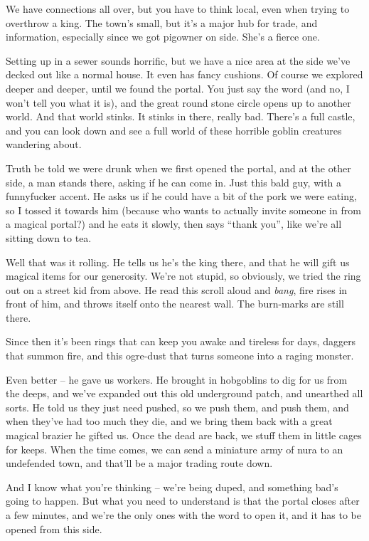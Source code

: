 \begin{speechtext}

	We have connections all over, but you have to think local, even when trying to overthrow a king.  The town's small, but it's a major hub for trade, and information, especially since we got \gls{pigowner} on side.  She's a fierce one.

	Setting up in a sewer sounds horrific, but we have a nice area at the side we've decked out like a normal house.
	It even has fancy cushions.
	Of course we explored deeper and deeper, until we found the portal.
	You just say the word (and no, I won't tell you what it is), and the great round stone circle opens up to another world.
	And that world stinks.
	It stinks in there, really bad.
	There's a full castle, and you can look down and see a full world of these horrible goblin creatures wandering about.

	Truth be told we were drunk when we first opened the portal, and at the other side, a man stands there, asking if he can come in.
	Just this bald guy, with a funnyfucker accent.
	He asks us if he could have a bit of the pork we were eating, so I tossed it towards him (because who wants to actually invite someone in from a magical portal?) and he eats it slowly, then says ``thank you'', like we're all sitting down to tea.

	Well that was it rolling.  He tells us he's the king there, and that he will gift us magical items for our generosity.  We're not stupid, so obviously, we tried the ring out on a street kid from above.  He read this scroll aloud and \emph{bang}, fire rises in front of him, and throws itself onto the nearest wall.  The burn-marks are still there.

	Since then it's been rings that can keep you awake and tireless for days, daggers that summon fire, and this ogre-dust that turns someone into a raging monster.

	Even better -- he gave us workers.
	He brought in hobgoblins to dig for us from the deeps, and we've expanded out this old underground patch, and unearthed all sorts.
	He told us they just need pushed, so we push them, and push them, and when they've had too much they die, and we bring them back with a great magical brazier he gifted us.
	Once the dead are back, we stuff them in little cages for keeps.
	When the time comes, we can send a miniature army of nura to an undefended town, and that'll be a major trading route down.

	And I know what you're thinking -- we're being duped, and something bad's going to happen.  But what you need to understand is that the portal closes after a few minutes, and we're the only ones with the word to open it, and it has to be opened from this side.

\end{speechtext}

